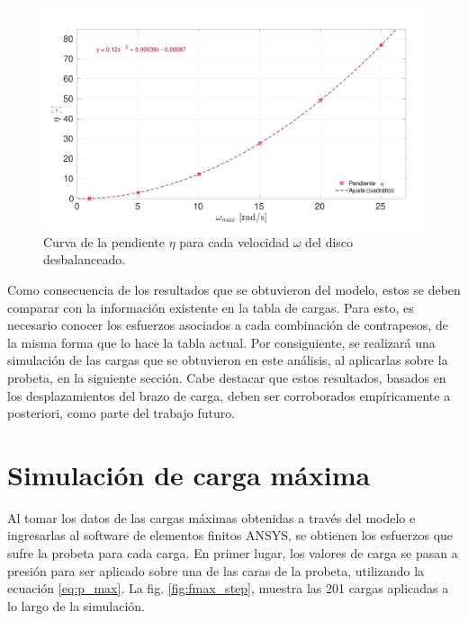 \begin{figure}[h]
\centering
\includegraphics[width=1\linewidth, trim={0cm 0cm 0cm 1cm}, clip]{Imagenes/eta_w.pdf}
\caption{Curva de la pendiente $\eta$ para cada velocidad $\omega$ del disco desbalanceado.}
\label{fig:eta_w}
\end{figure}

\newpage

Como consecuencia de los resultados que se obtuvieron del modelo, estos se deben comparar con la información existente en la tabla de cargas. Para esto, es necesario conocer los esfuerzos asociados a cada combinación de contrapesos, de la misma forma que lo hace la tabla actual. Por consiguiente, se realizará una simulación de las cargas que se obtuvieron en este análisis, al aplicarlas sobre la probeta, en la siguiente sección. Cabe destacar que estos resultados, basados en los desplazamientos del brazo de carga, deben ser corroborados empíricamente a posteriori, como parte del trabajo futuro. 

\newpage

\section{Simulación de carga máxima}

Al tomar los datos de las cargas máximas obtenidas a través del modelo e ingresarlas al software de elementos finitos ANSYS, se obtienen los esfuerzos que sufre la probeta para cada carga. En primer lugar, los valores de carga se pasan a presión para ser aplicado sobre una de las caras de la probeta, utilizando la ecuación \ref{eq:p_max}. La fig. \ref{fig:fmax_step}, muestra las 201 cargas aplicadas a lo largo de la simulación. 


